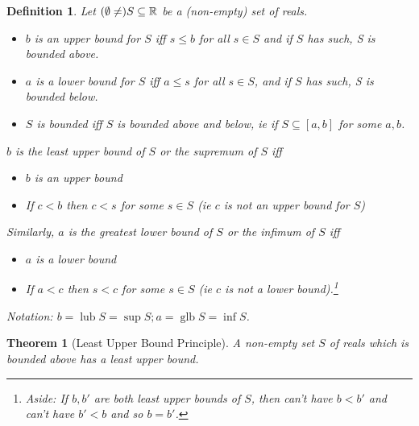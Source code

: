 \documentclass{notes}
\theoremstyle{plain}
\newtheorem{theorem}[proposition]{Theorem}
\newtheorem{definition}[proposition]{Definition}
\DeclareMathOperator{\lub}{lub}
\DeclareMathOperator{\glb}{glb}
\begin{document}
\begin{definition}
Let $ (\emptyset \neq) S \subseteq \mathbb{R} $ be a (non-empty) set of 
reals.

\begin{itemize}
\item $ b $ is an \emph{upper bound} for $ S $ iff $ s \leq b $ for 
all $ s \in S $ and if $ S $ has such, S is \emph{bounded above}.

\item $ a $ is a \emph{lower bound} for $ S $ iff $ a\leq s 
$ for all $ s \in S $, and if $ S $ has such, S is \emph{bounded 
below}.

\item $S$ is \emph{bounded} iff $ S $ is bounded above and below, ie if $ S 
\subseteq [a,b] $ for some $ a,b $.
\end{itemize}

$ b $ is the \emph{least upper bound} of $ S $ or the 
\emph{supremum} of $ S $ iff
\begin{itemize}
\item $ b $ is an upper bound
\item If $ c < b $ then $ c<s $ for some $ s \in S $ (ie $ c $ 
is not an upper bound for $ S $)
\end{itemize}

Similarly, $ a $ is the \emph{greatest lower bound} of $ S $ or 
the \emph{infimum} of $ S $ iff
\begin{itemize}
\item $ a $ is a lower bound
\item If $ a < c $ then $ s<c $ for some $ s \in S $ (ie $ c 
$ is not a lower bound).\footnote{Aside: If $ b, b' $ are both least upper bounds of $ S $, 
then can't have $ b < b' $ and can't have $ b'<b $ and so $ b = b' $.}
\end{itemize}

Notation: $ b = \lub S= \sup S; a = \glb S = \inf S $.
\end{definition}

\begin{theorem}[Least Upper Bound Principle]
A non-empty set $ S $ of reals which is bounded above has a least 
upper bound.
\end{theorem}
\end{document}
